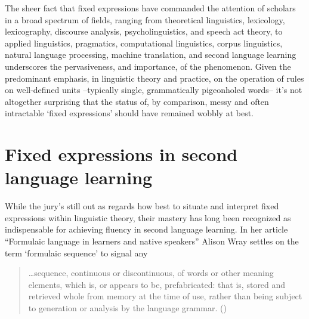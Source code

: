 \documentclass[output=paper]{langsci/langscibook}
\begin{document}
The sheer fact that fixed expressions have commanded the attention of scholars in a broad spectrum of fields, ranging from theoretical linguistics, lexicology, lexicography, discourse analysis, psycholinguistics, and speech act theory, to applied linguistics, pragmatics, computational linguistics, corpus linguistics, natural language processing, machine translation, and second language learning underscores the pervasiveness, and importance, of the phenomenon. Given the predominant emphasis, in linguistic theory and practice, on the operation of rules on well-defined units –typically single, grammatically pigeonholed words– it’s not altogether surprising that the status of, by comparison, messy and often intractable ‘fixed expressions’ should have remained wobbly at best. 

\section{Fixed expressions in second language learning}

While the jury’s still out as regards how best to situate and interpret fixed expressions within linguistic theory, their mastery has long been recognized as indispensable for achieving fluency in second language learning. In her article “Formulaic language in learners and native speakers” Alison Wray settles on the term ‘formulaic sequence’ to signal any 

\begin{quote}
    …sequence, continuous or discontinuous, of words or other meaning elements, which is, or appears to be, prefabricated: that is, stored and retrieved whole from memory at the time of use, rather than being subject to generation or analysis by the language grammar. (\citeyear[214]{wray_formulaic_1999})  
\end{quote}
\end{document}
